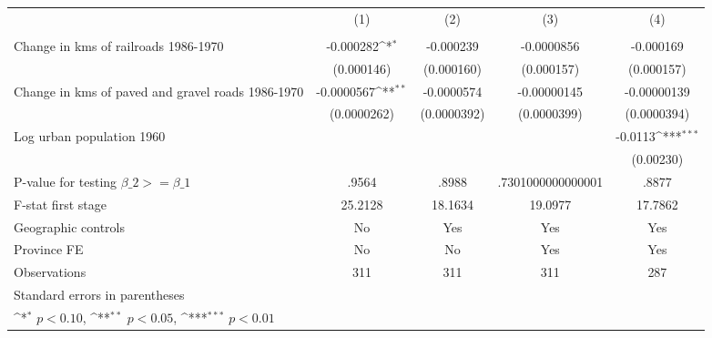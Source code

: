 {
\def\sym#1{\ifmmode^{#1}\else\(^{#1}\)\fi}
\begin{tabular}{l*{4}{c}}
\hline\hline
                &\multicolumn{1}{c}{(1)}&\multicolumn{1}{c}{(2)}&\multicolumn{1}{c}{(3)}&\multicolumn{1}{c}{(4)}\\
                &\multicolumn{1}{c}{}&\multicolumn{1}{c}{}&\multicolumn{1}{c}{}&\multicolumn{1}{c}{}\\
\hline
Change in kms of railroads 1986-1970&-0.000282\sym{*}  &-0.000239         &-0.0000856         &-0.000169         \\
                &(0.000146)         &(0.000160)         &(0.000157)         &(0.000157)         \\
[1em]
Change in kms of paved and gravel roads 1986-1970&-0.0000567\sym{**} &-0.0000574         &-0.00000145         &-0.00000139         \\
                &(0.0000262)         &(0.0000392)         &(0.0000399)         &(0.0000394)         \\
[1em]
Log urban population 1960&                  &                  &                  &  -0.0113\sym{***}\\
                &                  &                  &                  &(0.00230)         \\
\hline
P-value for testing $\beta\_{2} >= \beta\_{1}$&    .9564         &    .8988         &.7301000000000001         &    .8877         \\
F-stat first stage&  25.2128         &  18.1634         &  19.0977         &  17.7862         \\
Geographic controls&       No         &      Yes         &      Yes         &      Yes         \\
Province FE     &       No         &       No         &      Yes         &      Yes         \\
Observations    &      311         &      311         &      311         &      287         \\
\hline\hline
\multicolumn{5}{l}{\footnotesize Standard errors in parentheses}\\
\multicolumn{5}{l}{\footnotesize \sym{*} \(p<0.10\), \sym{**} \(p<0.05\), \sym{***} \(p<0.01\)}\\
\end{tabular}
}
